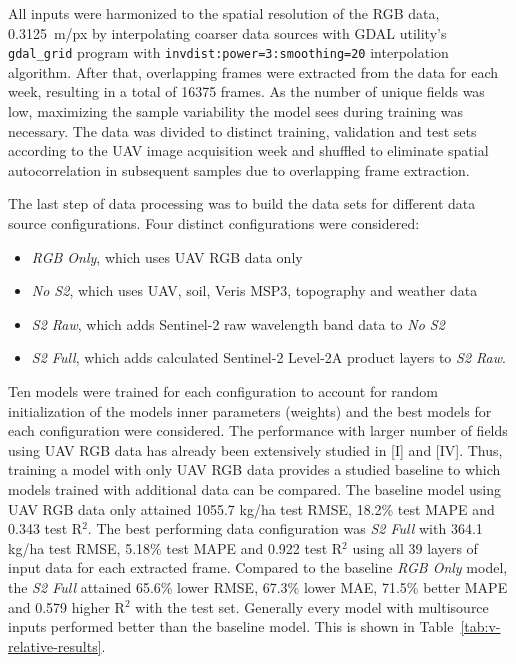 All inputs were harmonized to the spatial resolution of the RGB data, 0.3125~m/px by interpolating coarser data sources with GDAL utility's \texttt{gdal\_grid} program with \texttt{invdist:power=3:smoothing=20} interpolation algorithm. After that, overlapping frames were extracted from the data for each week, resulting in a total of 16375 frames. As the number of unique fields was low, maximizing the sample variability the model sees during training was necessary. The data was divided to distinct training, validation and test sets according to the UAV image acquisition week and shuffled to eliminate spatial autocorrelation in subsequent samples due to overlapping frame extraction. 

The last step of data processing was to build the data sets for different data source configurations. Four distinct configurations were considered:

\begin{itemize}
    \item \emph{RGB Only}, which uses UAV RGB data only
    \item \emph{No S2}, which uses UAV, soil, Veris MSP3, topography and weather data
    \item \emph{S2 Raw}, which adds Sentinel-2 raw wavelength band data to \emph{No S2}
    \item \emph{S2 Full}, which adds calculated Sentinel-2 Level-2A product layers to \emph{S2 Raw}.
\end{itemize}

Ten models were trained for each configuration to account for random initialization of the models inner parameters (weights) and the best models for each configuration were considered. The performance with larger number of fields using UAV RGB data has already been extensively studied in [I] and [IV]. Thus, training a model with only UAV RGB data provides a studied baseline to which models trained with additional data can be compared. The baseline model using UAV RGB data only attained 1055.7 kg/ha test RMSE, 18.2\% test MAPE and 0.343 test R$^2$. The best performing data configuration was \emph{S2 Full} with 364.1 kg/ha test RMSE, 5.18\% test MAPE and 0.922 test R$^2$ using all 39 layers of input data for each extracted frame. Compared to the baseline \emph{RGB Only} model, the \emph{S2 Full} attained 65.6\% lower RMSE, 67.3\% lower MAE, 71.5\% better MAPE and 0.579 higher R$^2$ with the test set. Generally every model with multisource inputs performed better than the baseline model. This is shown in Table~\ref{tab:v-relative-results}.

